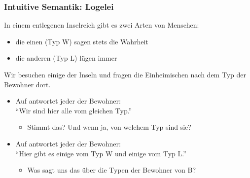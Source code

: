 \documentclass[aspectratio=1610,onlymath]{beamer}
\begin{document}
\begin{frame}\frametitle{Intuitive Semantik: Logelei}

In einem entlegenen Inselreich gibt es zwei Arten von Menschen:
\begin{itemize}
\item die einen (Typ W) sagen stets die Wahrheit
\item die anderen (Typ L) lügen immer
\end{itemize}
\bigskip\pause

Wir besuchen einige der Inseln und fragen die Einheimischen
nach dem Typ der Bewohner dort.\pause

\begin{itemize}
\item Auf  antwortet jeder der Bewohner:\\ \alert{"`Wir sind hier alle vom gleichen Typ."'}\\
\begin{itemize}
\item Stimmt das? Und wenn ja, von welchem Typ sind sie?
\end{itemize}\pause
\item Auf  antwortet jeder der Bewohner:\\ \alert{"`Hier gibt es einige vom Typ W und einige vom Typ L."'}
\begin{itemize}
\item Was sagt uns das über die Typen der Bewohner von B?
\end{itemize}
\end{itemize}




\end{frame}
\end{document}
